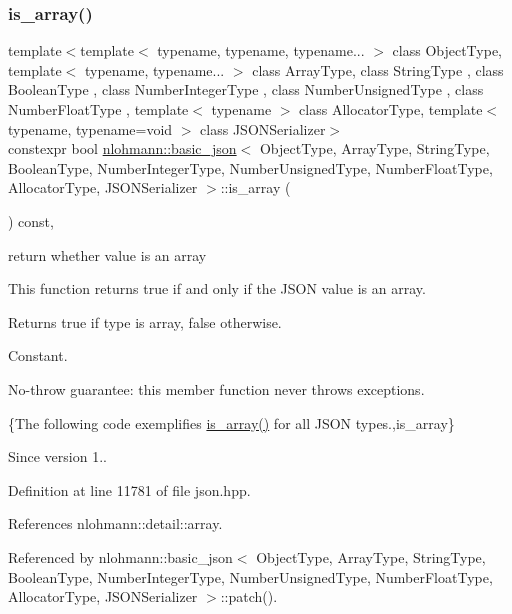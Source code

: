 \subsubsection{\texorpdfstring{is\+\_\+array()}{is\_array()}}
{\footnotesize\ttfamily template$<$template$<$ typename, typename, typename... $>$ class Object\+Type, template$<$ typename, typename... $>$ class Array\+Type, class String\+Type , class Boolean\+Type , class Number\+Integer\+Type , class Number\+Unsigned\+Type , class Number\+Float\+Type , template$<$ typename $>$ class Allocator\+Type, template$<$ typename, typename=void $>$ class J\+S\+O\+N\+Serializer$>$ \\
constexpr bool \hyperlink{classnlohmann_1_1basic__json}{nlohmann\+::basic\+\_\+json}$<$ Object\+Type, Array\+Type, String\+Type, Boolean\+Type, Number\+Integer\+Type, Number\+Unsigned\+Type, Number\+Float\+Type, Allocator\+Type, J\+S\+O\+N\+Serializer $>$\+::is\+\_\+array (\begin{DoxyParamCaption}{ }\end{DoxyParamCaption}) const\hspace{0.3cm}{\ttfamily [inline]}, {\ttfamily [noexcept]}}



return whether value is an array 

This function returns true if and only if the J\+S\+ON value is an array.

\begin{DoxyReturn}{Returns}
{\ttfamily true} if type is array, {\ttfamily false} otherwise.
\end{DoxyReturn}
Constant.

No-\/throw guarantee\+: this member function never throws exceptions.

\{The following code exemplifies {\ttfamily \hyperlink{classnlohmann_1_1basic__json_aef9ce5dd2381caee1f8ddcdb5bdd9c65}{is\+\_\+array()}} for all J\+S\+ON types.,is\+\_\+array\}

\begin{DoxySince}{Since}
version 1.. 
\end{DoxySince}


Definition at line 11781 of file json.\+hpp.



References nlohmann\+::detail\+::array.



Referenced by nlohmann\+::basic\+\_\+json$<$ Object\+Type, Array\+Type, String\+Type, Boolean\+Type, Number\+Integer\+Type, Number\+Unsigned\+Type, Number\+Float\+Type, Allocator\+Type, J\+S\+O\+N\+Serializer $>$\+::patch().


